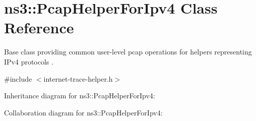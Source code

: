 \hypertarget{classns3_1_1PcapHelperForIpv4}{}\section{ns3\+:\+:Pcap\+Helper\+For\+Ipv4 Class Reference}
\label{classns3_1_1PcapHelperForIpv4}


Base class providing common user-\/level pcap operations for helpers representing I\+Pv4 protocols .  




{\ttfamily \#include $<$internet-\/trace-\/helper.\+h$>$}



Inheritance diagram for ns3\+:\+:Pcap\+Helper\+For\+Ipv4\+:


Collaboration diagram for ns3\+:\+:Pcap\+Helper\+For\+Ipv4\+:
